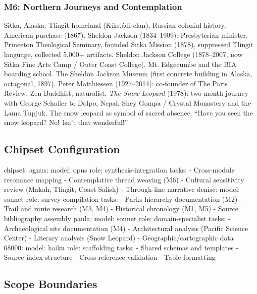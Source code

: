 \documentclass[11pt,letterpaper]{article}
\begin{document}
\subsubsection{M6: Northern Journeys and Contemplation}
Sitka, Alaska: Tlingit homeland (Kiks.ádi clan), Russian colonial history, American purchase (1867). Sheldon Jackson (1834--1909): Presbyterian minister, Princeton Theological Seminary, founded Sitka Mission (1878), suppressed Tlingit language, collected 5,000+ artifacts. Sheldon Jackson College (1878--2007, now Sitka Fine Arts Camp / Outer Coast College). Mt. Edgecumbe and the BIA boarding school. The Sheldon Jackson Museum (first concrete building in Alaska, octagonal, 1897). Peter Matthiessen (1927--2014): co-founder of The Paris Review, Zen Buddhist, naturalist. \textit{The Snow Leopard} (1978): two-month journey with George Schaller to Dolpo, Nepal. Shey Gompa / Crystal Monastery and the Lama Tupjuk. The snow leopard as symbol of sacred absence. ``Have you seen the snow leopard? No! Isn't that wonderful!''

\subsection{Chipset Configuration}

\begin{asciibox}
chipset:
  agnus:
    model: opus
    role: synthesis-integration
    tasks:
      - Cross-module resonance mapping
      - Contemplative thread weaving (M6)
      - Cultural sensitivity review (Makah, Tlingit, Coast Salish)
      - Through-line narrative
  denise:
    model: sonnet
    role: survey-compilation
    tasks:
      - Parks hierarchy documentation (M2)
      - Trail and route research (M3, M4)
      - Historical chronology (M1, M5)
      - Source bibliography assembly
  paula:
    model: sonnet
    role: domain-specialist
    tasks:
      - Archaeological site documentation (M4)
      - Architectural analysis (Pacific Science Center)
      - Literary analysis (Snow Leopard)
      - Geographic/cartographic data
  68000:
    model: haiku
    role: scaffolding
    tasks:
      - Shared schemas and templates
      - Source index structure
      - Cross-reference validation
      - Table formatting
\end{asciibox}

\subsection{Scope Boundaries}
\end{document}
